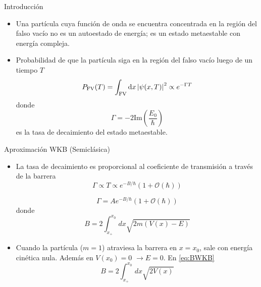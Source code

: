 \documentclass{beamer}
\theoremstyle{example}
\theoremstyle{example}
\begin{document}
\begin{frame}{Introducción}
\begin{itemize}
    \item Una partícula cuya función de onda se encuentra concentrada en la región del falso vacío no es un autoestado de energía; es un estado metaestable con energía compleja.
    
    \item Probabilidad de que la partícula siga en la región del falso vacío luego de un tiempo $T$
    \begin{equation}
        P_{\mathrm{FV}}(T) = \int_{\mathrm{FV}} \dd{x} \qty| \psi (x, T) |^2
        \propto e^{-\Gamma T}
    \end{equation}
    donde
    \begin{equation}\label{eq:gammaE}
        \Gamma = -2 \mathrm{Im}\left(\frac{E_0}{\hbar}\right)
    \end{equation}
    es la tasa de decaimiento del estado metaestable. 
    
\end{itemize}
\end{frame}

\begin{frame}{Aproximación WKB (Semiclásica)}
\begin{itemize}
    \item  La tasa de decaimiento es proporcional al coeficiente de transmisión a través de la barrera
    \begin{equation}
        \Gamma \propto T \propto e^{-B/\hbar}(1 + \mathcal{O}(\hbar))
    \end{equation}
    
    \begin{equation}\label{eq:decay}
        \Gamma = A e^{-B/\hbar} (1 + \mathcal{O}(\hbar))
    \end{equation}
    donde
    \begin{equation}\label{eq:BWKB}
        B = 2 \int_{x_+}^{x_0} dx \sqrt{2m \left(V(x) - E\right)}
    \end{equation}
    
    \item Cuando la partícula ($m = 1$) atraviesa la barrera en $x = x_0$, sale con energía cinética nula. Además en $V(x_0) = 0$ $\rightarrow E = 0$. En \eqref{eq:BWKB}
    \begin{equation}\label{eq:B}
        B = 2 \int_{x_+}^{x_0} dx \sqrt{2V(x)}
    \end{equation}
\end{itemize}

\end{frame}
\end{document}
